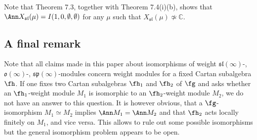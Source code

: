 \documentclass[12pt]{amsart}
\begin{document}
Note that Theorem 7.3, together with Theorem 7.4(i)(b), shows that $\Ann X_{\mathfrak{sl}}(\mu)= I(1,0,\emptyset, \emptyset)$ for any $\mu$ such that $X_{\mathfrak{sl}}(\mu)\not\simeq\mathbb{C}$.

\subsection{A final remark}

Note that all claims made in this paper about isomorphisms of weight $\mathfrak{sl}(\infty)$-, $\mathfrak{o}(\infty)$-, $\mathfrak{sp}(\infty)$-modules concern weight modules for a fixed Cartan subalgebra $\fh$. If one fixes two Cartan subalgebras $\fh_1$ and $\fh_2$ of $\fg$ and asks whether an $\fh_1$-weight module  $M_1$ is isomorphic to an $\fh_2$-weight module $M_2$, we do not have an answer to this question. It is however obvious, that a $\fg$-isomorphism
  $M_1\simeq M_2$ implies $\Ann M_1=\Ann M_2$ and that $\fh_2$ acts locally finitely on $M_1$, and vice versa. This allows to rule out some possible isomorphisms but the general isomorphism problem appears to be open.

%
\end{document}
